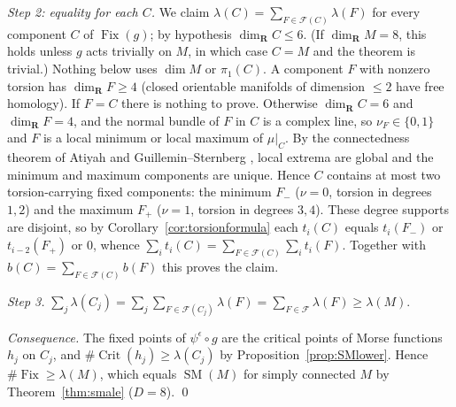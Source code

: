 \documentclass[11pt]{amsart}
\numberwithin{equation}{section}
\theoremstyle{definition}
\theoremstyle{remark}
\newcommand{\R}{\mathbf R}
\DeclareMathOperator{\SM}{SM}
\DeclareMathOperator{\Crit}{Crit}
\DeclareMathOperator{\Fix}{Fix}
\begin{document}
\emph{Step 2: equality for each $C$.} We claim
$\lambda(C)=\sum_{F\in\mathcal F(C)}\lambda(F)$ for every component $C$ of
$\Fix(g)$; by hypothesis $\dim_\R C\le6$. (If $\dim_\R M=8$, this holds
unless $g$ acts trivially on $M$, in which case $C=M$ and the theorem is
trivial.) Nothing below uses $\dim M$ or $\pi_1(C)$. A component $F$
with nonzero torsion has $\dim_\R F\ge4$ (closed orientable manifolds of
dimension $\le2$ have free homology). If $F=C$ there is nothing to prove.
Otherwise $\dim_\R C=6$ and $\dim_\R F=4$, and the normal bundle of $F$ in
$C$ is a complex line, so $\nu_F\in\{0,1\}$ and $F$ is a local minimum or
local maximum of $\mu|_C$. By the connectedness theorem of Atiyah and
Guillemin--Sternberg \cite{Atiyah1982,GuilleminSternberg1982}, local
extrema are global and the minimum and maximum components are unique.
Hence $C$ contains at most two torsion-carrying fixed components: the
minimum $F_-$ ($\nu=0$, torsion in degrees $1,2$) and the maximum $F_+$
($\nu=1$, torsion in degrees $3,4$). These degree supports are disjoint,
so by Corollary~\ref{cor:torsionformula} each $t_i(C)$ equals $t_i(F_-)$ or
$t_{i-2}(F_+)$ or $0$, whence $\sum_it_i(C)=\sum_{F\in\mathcal F(C)}\sum_i
t_i(F)$. Together with $b(C)=\sum_{F\in\mathcal F(C)}b(F)$ this proves the
claim.

\emph{Step 3.} $\sum_j\lambda(C_j)=\sum_j\sum_{F\in\mathcal F(C_j)}\lambda(F)
=\sum_{F\in\mathcal F}\lambda(F)\ge\lambda(M)$.

\emph{Consequence.} The fixed points of $\psi^\epsilon\circ g$ are the
critical points of Morse functions $h_j$ on $C_j$, and
$\#\Crit(h_j)\ge\lambda(C_j)$ by Proposition~\ref{prop:SMlower}. Hence
$\#\Fix\ge\lambda(M)$, which equals $\SM(M)$ for simply connected $M$ by
Theorem~\ref{thm:smale} ($D=8$). \qed
\end{document}
